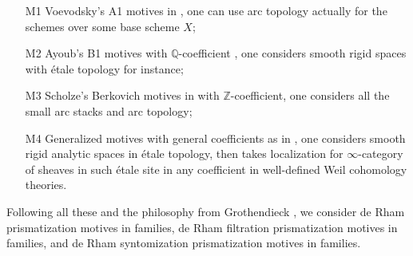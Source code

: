 \documentclass[12pt]{article}
\theoremstyle{definition}
\begin{document}
\begin{itemize}
\item[M1] Voevodsky's A1 motives in \cite{3V}, one can use arc topology actually for the schemes over some base scheme $X$;
\item[M2] Ayoub's B1 motives with $\mathbb{Q}$-coefficient \cite{31A}, one considers smooth rigid spaces with \'etale topology for instance;
\item[M3] Scholze's Berkovich motives in \cite{3S} with $\mathbb{Z}$-coefficient, one considers all the small arc stacks and arc topology;
\item[M4] Generalized motives with general coefficients as in \cite{3A}, one considers smooth rigid analytic spaces in \'etale topology, then takes localization for $\infty$-category of sheaves in such \'etale site in any coefficient in well-defined Weil cohomology theories.
\end{itemize}
Following all these and the philosophy from Grothendieck \cite{3G}, we consider de Rham prismatization motives in families, de Rham filtration prismatization motives in families, and de Rham syntomization prismatization motives in families.
\end{document}
